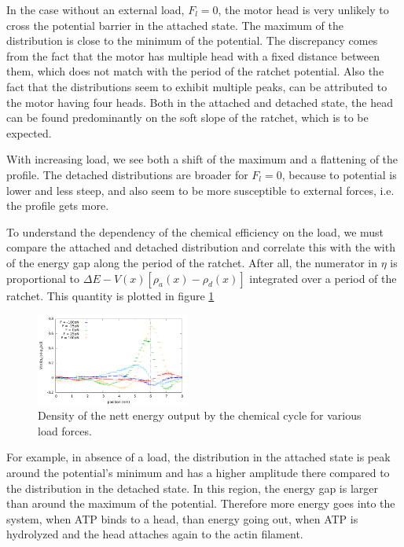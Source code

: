 \documentclass[aps,pre,twocolumn,showpacs,showkeys,a4paper]{revtex4}
\begin{document}
In the case without an external load, $F_l=0$, the motor head is very unlikely to cross the potential barrier in the attached state. 
The maximum of the distribution is close to the minimum of the potential. 
The discrepancy comes from the fact that the motor has multiple head with a fixed distance between them, which does not match with the period of the ratchet potential. 
Also the fact that the distributions seem to exhibit multiple peaks, can be attributed to the motor having four heads. 
Both in the attached and detached state, the head can be found predominantly on the soft slope of the ratchet, which is to be expected.


With increasing load, we see both a shift of the maximum and a flattening of the profile. 
The detached distributions are broader for $F_l=0$, because to potential is lower and less steep, and also seem to be more susceptible to external forces, i.e. the profile gets more. 


To understand the dependency of the chemical efficiency on the load, we must compare the attached and detached distribution and correlate this with the with of the energy gap along the period of the ratchet. 
After all, the numerator in $\eta$ is proportional to $\Delta E - V(x) \left[ \rho_a(x) - \rho_d(x) \right]$ integrated over a period of the ratchet. 
This quantity is plotted in figure \ref{Fig: chem_energy_distr}
\begin{figure}[b]
\centering
\includegraphics[width=0.45\textwidth,height=!]{chem_energy_distr_all_F}
\caption{Density of the nett energy output by the chemical cycle for various load forces.}
\label{Fig: chem_energy_distr}
\end{figure}


For example, in absence of a load, the distribution in the attached state is peak around the potential's minimum and has a higher amplitude there compared to the distribution in the detached state. 
In this region, the energy gap is larger than around the maximum of the potential. 
Therefore more energy goes into the system, when ATP binds to a head, than energy going out, when ATP is hydrolyzed and the head attaches again to the actin filament. 
\end{document}
